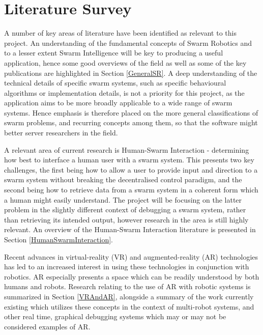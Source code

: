 \documentclass[titlepage,hidelinks,10pt]{article}
\begin{document}
\section{Literature Survey}
A number of key areas of literature have been identified as relevant to this project. An understanding of the fundamental concepts of Swarm Robotics and to a lesser extent Swarm Intelligence will be key to producing a useful application, hence some good overviews of the field as well as some of the key publications are highlighted in Section \ref{GeneralSR}. A deep understanding of the technical details of specific swarm systems, such as specific behavioural algorithms or implementation details, is not a priority for this project, as the application aims to be more broadly applicable to a wide range of swarm systems. Hence emphasis is therefore placed on the more general classifications of swarm problems, and recurring concepts among them, so that the software might better server researchers in the field.

A relevant area of current research is Human-Swarm Interaction - determining how best to interface a human user with a swarm system. This presents two key challenges, the first being how to allow a user to provide input and direction to a swarm system without breaking the decentralised control paradigm, and the second being how to retrieve data from a swarm system in a coherent form which a human might easily understand. The project will be focusing on the latter problem in the slightly different context of debugging a swarm system, rather than retrieving its intended output, however research in the area is still highly relevant. An overview of the Human-Swarm Interaction literature is presented in Section \ref{HumanSwarmInteraction}.

Recent advances in virtual-reality (VR) and augmented-reality (AR) technologies has led to an increased interest in using these technologies in conjunction with robotics. AR especially presents a space which can be readily understood by both humans and robots. Research relating to the use of AR with robotic systems is summarized in Section \ref{VRAndAR}, alongside a summary of the work currently existing which utilizes these concepts in the context of multi-robot systems, and other real time, graphical debugging systems which may or may not be considered examples of AR.
\end{document}
